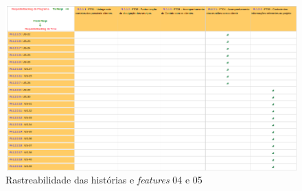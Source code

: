 \begin{figure}[!htb]
 \centering
 \includegraphics[scale= 0.5]{figuras/ft04e05.png}
 \caption{Rastreabilidade das histórias e \textit{features} 04 e 05}
 \label{fig:ft04}
\end{figure}
% 

% 
